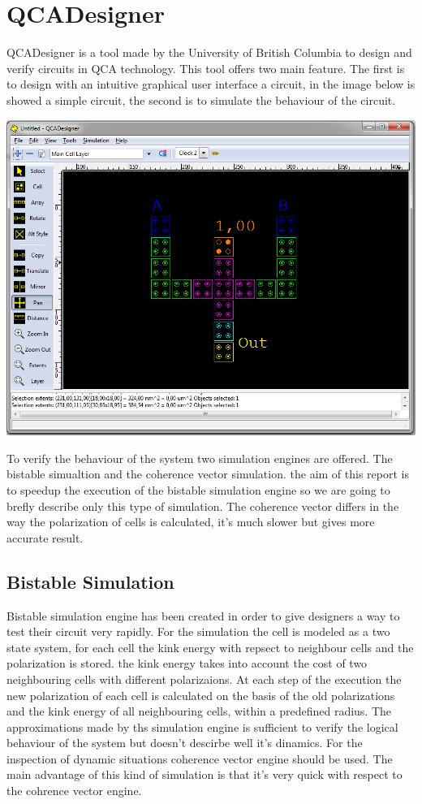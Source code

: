 \section{QCADesigner}
QCADesigner is a tool made by the University of British Columbia to design and verify circuits in QCA technology. This tool offers two main feature. The first is to design with an intuitive graphical user interface a circuit, in the image below is showed a simple circuit, the second is to simulate the behaviour of the circuit. 

\includegraphics[scale=0.4]{img/QCADesigner.png}

To verify the behaviour of the system two simulation engines are offered. The bistable simualtion and the coherence vector simulation. the aim of this report is to speedup the execution of the bistable simulation engine so we are going to brefly describe only this type of simulation. The coherence vector differs in the way the polarization of cells is calculated, it's much slower but gives more accurate result.


\subsection{Bistable Simulation}
Bistable simulation engine has been created in order to give designers a way to test their circuit very rapidly. For the simulation the cell is modeled as a two state system, for each cell the kink energy with repsect to neighbour cells and the polarization is stored. the kink energy takes into account the cost of two neighbouring cells with different polarizaions. At each step of the execution the new polarization of each cell is calculated on the basis of the old polarizations and the kink energy of all neighbouring cells, within a predefined radius. The approximations made by ths simulation engine is sufficient to verify the logical behaviour of the system but doesn't descirbe well it's dinamics. For the inspection of dynamic situations coherence vector engine should be used. The main advantage of this kind of simulation is that it's very quick with respect to the cohrence vector engine. 

